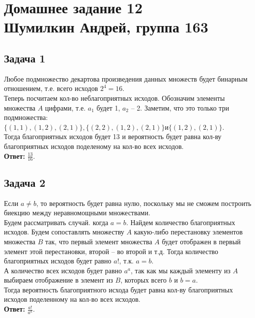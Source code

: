 

	\section{Домашнее задание 12\\ Шумилкин Андрей, группа 163} 
	\subsection{Задача 1}
	Любое подмножество декартова произведения данных множеств будет бинарным отношением, т.е. всего исходов $2^4 = 16$. \\
	Теперь посчитаем кол-во неблагоприятных исходов. Обозначим элементы множества $A$ цифрами, т.е. $a_1$ будет 1, $a_2$ -- 2. Заметим, что это только три подмножества: $\{(1,1),(1,2), (2,1) \}, \{(2,2),(1,2), (2,1) \}  и \{(1,2), (2,1) \}$.\\
	Тогда благоприятных исходов будет 13 и вероятность будет равна кол-ву благоприятных исходов поделеному на кол-во всех исходов.\\
	\textbf{Ответ:} $\frac{13}{16}$.
	
	\subsection{Задача 2}
	Если $a \not = b$, то вероятность будет равна нулю, поскольку мы не сможем построить биекцию между неравномощными множествами. \\
	Будем рассматривать случай. когда $a = b$. Найдем количество благоприятных исходов. Будем сопоставлять множеству $A$ какую-либо перестановку элементов множества $B$ так, что первый элемент множества $A$ будет отображен в первый элемент этой перестановки, второй -- во второй и т.д. Тогда количество благоприятных исходов будет равно $a!$, т.к. $a=b$.  \\
	А количество всех исходов будет равно $a^a$, так как мы каждый элементу из $A$ выбираем отображение в элемент из $B$, которых всего $b$ и $b = a$.  \\
	Тогда вероятность благоприятного исхода будет равна кол-ву благоприятных исходов поделенному на кол-во всех исходов.\\
	\textbf{Ответ:} $\frac{a!}{a^a}$.
	
